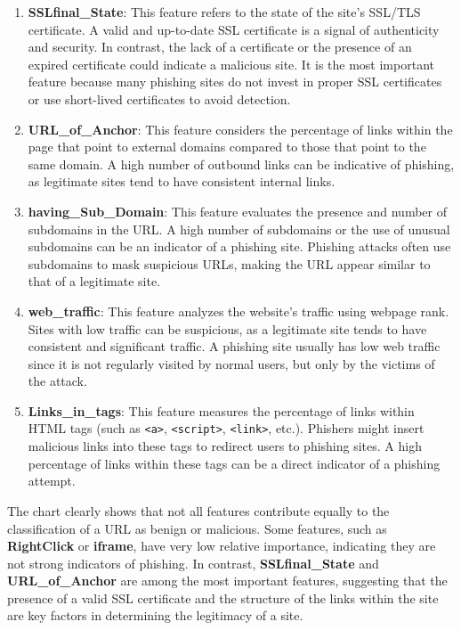 \begin{enumerate}
    \item \textbf{SSLfinal\_State}: 
         This feature refers to the state of the site's SSL/TLS certificate. A valid and up-to-date SSL certificate is a signal of authenticity and security. In contrast, the lack of a certificate or the presence of an expired certificate could indicate a malicious site. 
         It is the most important feature because many phishing sites do not invest in proper SSL certificates or use short-lived certificates to avoid detection.
    
    \item \textbf{URL\_of\_Anchor}:
         This feature considers the percentage of links within the page that point to external domains compared to those that point to the same domain. A high number of outbound links can be indicative of phishing, as legitimate sites tend to have consistent internal links.
    
    \item \textbf{having\_Sub\_Domain}:
        This feature evaluates the presence and number of subdomains in the URL. A high number of subdomains or the use of unusual subdomains can be an indicator of a phishing site.
        Phishing attacks often use subdomains to mask suspicious URLs, making the URL appear similar to that of a legitimate site.
    
    \item \textbf{web\_traffic}:
        This feature analyzes the website's traffic using webpage rank. Sites with low traffic can be suspicious, as a legitimate site tends to have consistent and significant traffic.
        A phishing site usually has low web traffic since it is not regularly visited by normal users, but only by the victims of the attack.
    
    \item \textbf{Links\_in\_tags}:
        This feature measures the percentage of links within HTML tags (such as \texttt{<a>}, \texttt{<script>}, \texttt{<link>}, etc.). Phishers might insert malicious links into these tags to redirect users to phishing sites.
        A high percentage of links within these tags can be a direct indicator of a phishing attempt.
\end{enumerate}

The chart clearly shows that not all features contribute equally to the classification of a URL as benign or malicious. Some features, such as \textbf{RightClick} or \textbf{iframe}, have very low relative importance, indicating they are not strong indicators of phishing. In contrast, \textbf{SSLfinal\_State} and \textbf{URL\_of\_Anchor} are among the most important features, suggesting that the presence of a valid SSL certificate and the structure of the links within the site are key factors in determining the legitimacy of a site.

